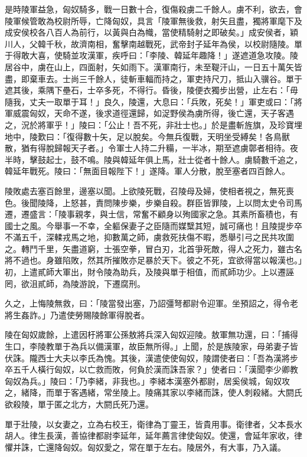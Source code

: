 \begin{pinyinscope}
是時陵軍益急，匈奴騎多，戰一日數十合，復傷殺虜二千餘人。虜不利，欲去，會陵軍候管敢為校尉所辱，亡降匈奴，具言「陵軍無後救，射矢且盡，獨將軍麾下及成安侯校各八百人為前行，以黃與白為幟，當使精騎射之即破矣。」成安侯者，穎川人，父韓千秋，故濟南相，奮擊南越戰死，武帝封子延年為侯，以校尉隨陵。單于得敢大喜，使騎並攻漢軍，疾呼曰：「李陵、韓延年趣降！」遂遮道急攻陵。陵居谷中，虜在山上，四面射，矢如雨下。漢軍南行，未至鞮汗山，一日五十萬矢皆盡，即棄車去。士尚三千餘人，徒斬車輻而持之，軍吏持尺刀，抵山入骥谷。單于遮其後，乘隅下壘石，士卒多死，不得行。昏後，陵便衣獨步出營，止左右：「毋隨我，丈夫一取單于耳！」良久，陵還，大息曰：「兵敗，死矣！」軍吏或曰：「將軍威震匈奴，天命不遂，後求道徑還歸，如浞野侯為虜所得，後亡還，天子客遇之，況於將軍乎！」陵曰：「公止！吾不死，非壯士也。」於是盡斬旌旗，及珍寶埋地中，陵歎曰：「復得數十矢，足以脫矣。今無兵復戰，天明坐受縛矣！各鳥獸散，猶有得脫歸報天子者。」令軍士人持二升糒，一半冰，期至遮虜鄣者相待。夜半時，擊鼓起士，鼓不鳴。陵與韓延年俱上馬，壯士從者十餘人。虜騎數千追之，韓延年戰死。陵曰：「無面目報陛下！」遂降。軍人分散，脫至塞者四百餘人。

陵敗處去塞百餘里，邊塞以聞。上欲陵死戰，召陵母及婦，使相者視之，無死喪色。後聞陵降，上怒甚，責問陳步樂，步樂自殺。群臣皆罪陵，上以問太史令司馬遷，遷盛言：「陵事親孝，與士信，常奮不顧身以殉國家之急。其素所畜積也，有國士之風。今舉事一不幸，全軀保妻子之臣隨而媒糱其短，誠可痛也！且陵提步卒不滿五千，深輮戎馬之地，抑數萬之師，虜救死扶傷不暇，悉舉引弓之民共攻圍之。轉鬥千里，矢盡道窮，士張空拳，冒白刃，北首爭死敵，得人之死力，雖古名將不過也。身雖陷敗，然其所摧敗亦足暴於天下。彼之不死，宜欲得當以報漢也。」初，上遣貳師大軍出，財令陵為助兵，及陵與單于相值，而貳師功少。上以遷誣罔，欲沮貳師，為陵游說，下遷腐刑。

久之，上悔陵無救，曰：「陵當發出塞，乃詔彊弩都尉令迎軍。坐預詔之，得令老將生姦詐。」乃遣使勞賜陵餘軍得脫者。

陵在匈奴歲餘，上遣因杅將軍公孫敖將兵深入匈奴迎陵。敖軍無功還，曰：「捕得生口，李陵教單于為兵以備漢軍，故臣無所得。」上聞，於是族陵家，母弟妻子皆伏誅。隴西士大夫以李氏為愧。其後，漢遣使使匈奴，陵謂使者曰：「吾為漢將步卒五千人橫行匈奴，以亡救而敗，何負於漢而誅吾家？」使者曰：「漢聞李少卿教匈奴為兵。」陵曰：「乃李緒，非我也。」李緒本漢塞外都尉，居奚侯城，匈奴攻之，緒降，而單于客遇緒，常坐陵上。陵痛其家以李緒而誅，使人刺殺緒。大閼氏欲殺陵，單于匿之北方，大閼氏死乃還。

單于壯陵，以女妻之，立為右校王，衛律為丁靈王，皆貴用事。衛律者，父本長水胡人。律生長漢，善協律都尉李延年，延年薦言律使匈奴。使還，會延年家收，律懼并誅，亡還降匈奴。匈奴愛之，常在單于左右。陵居外，有大事，乃入議。


\end{pinyinscope}
